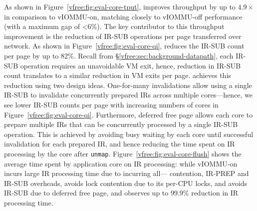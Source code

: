 As shown in Figure~\ref{vfree:fig:eval-core-tput}, {\vfreename} improves throughput by up to $4.9\times$ in comparison to vIOMMU-on, 
matching closely to vIOMMU-off performance (with a maximum gap of <6\%).
The key contributor to this throughput improvement is the reduction of IR-SUB operations per page transferred over network. As shown in Figure~\ref{vfree:fig:eval-core-qi}, {\vfreename} reduces the IR-SUB count per page by up to 82\%. Recall from \S\ref{vfree:sec:background-datapath}, each IR-SUB operation requires an unavoidable VM exit, hence, reduction in IR-SUB count translates to a similar reduction in VM exits per page. {\vfreename} achieves this reduction using two design ideas. One-for-many invalidations allow using a single IR-SUB to invalidate concurrently prepared IRs across multiple cores---hence, we see lower IR-SUB counts per page with increasing numbers of cores in Figure~\ref{vfree:fig:eval-core-qi}. Furthermore, deferred free page allows each core to prepare multiple IRs that can be concurrently processed by a single IR-SUB operation. This is achieved by avoiding busy waiting by each core until successful invalidation for each prepared IR, and hence reducing the time spent on IR processing by the core after {\tt unmap}. Figure~\ref{vfree:fig:eval-core-flush} shows the average time spent by application core on IR processing: while vIOMMU-on incurs large IR processing time due to incurring all--- contention, IR-PREP and IR-SUB overheads,  {\vfreename} avoids lock contention due to its per-CPU locks, and avoids IR-SUB due to deferred free page, and observes up to 99.9\% reduction in IR processing time. 

